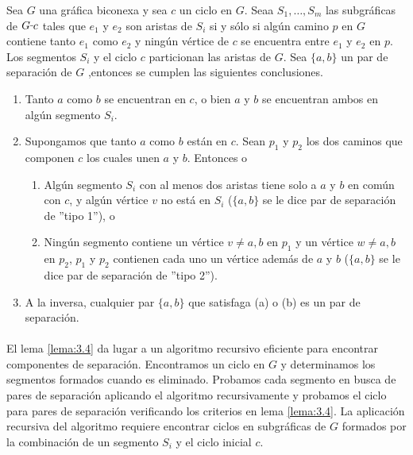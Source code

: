 \begin{lemma}
Sea $G$ una gráfica biconexa y sea $c$ un ciclo en $G$. Seaa $S_{1}, \ldots, S_{m}$ las subgráficas de $G \rule[1mm]{.1cm}{0.4pt} c$ tales que $e_{1}$ y $e_{2}$ son aristas de $S_{i}$ si y sólo si algún camino $p$ en $G$ contiene tanto $e_{1}$ como $e_{2}$ y ningún vértice de $c$ se encuentra entre $e_{1}$ y $e_{2}$ en $p$. Los segmentos $S_{i}$ y el ciclo $c$ particionan las aristas de $G$. Sea $\{a, b\}$ un par de separación de $G$ ,entonces se cumplen las siguientes conclusiones.
\begin{enumerate}
\item Tanto $a$ como $b$ se encuentran en $c$, o bien $a$ y $b$ se encuentran ambos en algún segmento $S_{i}$.
\item Supongamos que tanto $a$ como $b$ están en $c$. Sean $p_{1}$ y $p_{2}$ los dos caminos que componen $c$ los cuales unen $a$ y $b$. Entonces o
\begin{enumerate}
\item Algún segmento $S_{i}$ con al menos dos aristas tiene solo a $a$ y $b$ en común con $c$, y algún vértice $v$ no está en $S_{i}$ ($\{a, b\}$ se le dice par de separación de ''tipo 1''), o
\item Ningún segmento contiene un vértice $v \neq a, b$ en $p_{1}$ y un vértice $w \neq a, b$ en $p_{2}$, $p_{1}$ y $p_{2}$ contienen cada uno un vértice además de $a$ y $b$ ($\{a, b\}$ se le dice par de separación de ''tipo 2'').
\end{enumerate}
\item A la inversa, cualquier par $\{a, b\}$ que satisfaga (a) o (b) es un par de separación.
\end{enumerate}
\label{lema:3.4}
\end{lemma}

\paragraph{}

El lema \ref{lema:3.4} da lugar a un algoritmo recursivo eficiente para encontrar componentes de separación. Encontramos un ciclo en $G$ y determinamos los segmentos formados cuando es eliminado. Probamos cada segmento en busca de pares de separación aplicando el algoritmo recursivamente y probamos el ciclo para pares de separación verificando los criterios en lema \ref{lema:3.4}. La aplicación recursiva del algoritmo requiere encontrar ciclos en subgráficas de $G$ formados por la combinación de un segmento $S_{i}$ y el ciclo inicial $c$.


